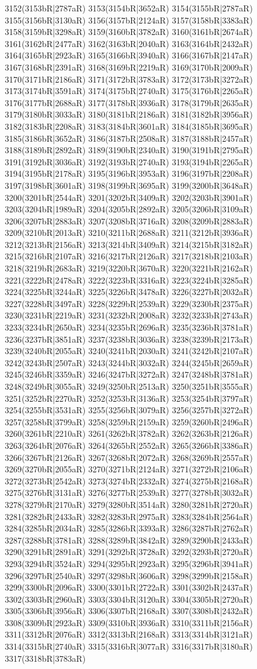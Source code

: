 3152(3153bR|2787aR) 3153(3154bR|3652aR) 3154(3155bR|2787aR) 3155(3156bR|3130aR) 3156(3157bR|2124aR) 3157(3158bR|3383aR) 3158(3159bR|3298aR) 3159(3160bR|3782aR) 3160(3161bR|2674aR) 3161(3162bR|2477aR) 3162(3163bR|2040aR) 3163(3164bR|2432aR) 3164(3165bR|2923aR) 3165(3166bR|3940aR) 3166(3167bR|2147aR) 3167(3168bR|2391aR) 3168(3169bR|2219aR) 3169(3170bR|2009aR) 3170(3171bR|2186aR) 3171(3172bR|3783aR) 3172(3173bR|3272aR) 3173(3174bR|3591aR) 3174(3175bR|2740aR) 3175(3176bR|2265aR) 3176(3177bR|2688aR) 3177(3178bR|3936aR) 3178(3179bR|2635aR) 3179(3180bR|3033aR) 3180(3181bR|2186aR) 3181(3182bR|3956aR) 3182(3183bR|2208aR) 3183(3184bR|3601aR) 3184(3185bR|3695aR) 3185(3186bR|3652aR) 3186(3187bR|2508aR) 3187(3188bR|2457aR) 3188(3189bR|2892aR) 3189(3190bR|2340aR) 3190(3191bR|2795aR) 3191(3192bR|3036aR) 3192(3193bR|2740aR) 3193(3194bR|2265aR) 3194(3195bR|2178aR) 3195(3196bR|3953aR) 3196(3197bR|2208aR) 3197(3198bR|3601aR) 3198(3199bR|3695aR) 3199(3200bR|3648aR) 3200(3201bR|2544aR) 3201(3202bR|3409aR) 3202(3203bR|3901aR) 3203(3204bR|1989aR) 3204(3205bR|2892aR) 3205(3206bR|3109aR) 3206(3207bR|2883aR) 3207(3208bR|3716aR) 3208(3209bR|2883aR) 3209(3210bR|2013aR) 3210(3211bR|2688aR) 3211(3212bR|3936aR) 3212(3213bR|2156aR) 3213(3214bR|3409aR) 3214(3215bR|3182aR) 3215(3216bR|2107aR) 3216(3217bR|2126aR) 3217(3218bR|2103aR) 3218(3219bR|2683aR) 3219(3220bR|3670aR) 3220(3221bR|2162aR) 3221(3222bR|2478aR) 3222(3223bR|3316aR) 3223(3224bR|3285aR) 3224(3225bR|3244aR) 3225(3226bR|3478aR) 3226(3227bR|2032aR) 3227(3228bR|3497aR) 3228(3229bR|2539aR) 3229(3230bR|2375aR) 3230(3231bR|2219aR) 3231(3232bR|2008aR) 3232(3233bR|2743aR) 3233(3234bR|2650aR) 3234(3235bR|2696aR) 3235(3236bR|3781aR) 3236(3237bR|3851aR) 3237(3238bR|3036aR) 3238(3239bR|2173aR) 3239(3240bR|2055aR) 3240(3241bR|2030aR) 3241(3242bR|2107aR) 3242(3243bR|2507aR) 3243(3244bR|3032aR) 3244(3245bR|2659aR) 3245(3246bR|3359aR) 3246(3247bR|3272aR) 3247(3248bR|3781aR) 3248(3249bR|3055aR) 3249(3250bR|2513aR) 3250(3251bR|3555aR) 3251(3252bR|2270aR) 3252(3253bR|3136aR) 3253(3254bR|3797aR) 3254(3255bR|3531aR) 3255(3256bR|3079aR) 3256(3257bR|3272aR) 3257(3258bR|3799aR) 3258(3259bR|2159aR) 3259(3260bR|2496aR) 3260(3261bR|2210aR) 3261(3262bR|3782aR) 3262(3263bR|2126aR) 3263(3264bR|2076aR) 3264(3265bR|2552aR) 3265(3266bR|3386aR) 3266(3267bR|2126aR) 3267(3268bR|2072aR) 3268(3269bR|2557aR) 3269(3270bR|2055aR) 3270(3271bR|2124aR) 3271(3272bR|2106aR) 3272(3273bR|2542aR) 3273(3274bR|2332aR) 3274(3275bR|2168aR) 3275(3276bR|3131aR) 3276(3277bR|2539aR) 3277(3278bR|3032aR) 3278(3279bR|2170aR) 3279(3280bR|3514aR) 3280(3281bR|2720aR) 3281(3282bR|2433aR) 3282(3283bR|2975aR) 3283(3284bR|2564aR) 3284(3285bR|2034aR) 3285(3286bR|3393aR) 3286(3287bR|2762aR) 3287(3288bR|3781aR) 3288(3289bR|3842aR) 3289(3290bR|2433aR) 3290(3291bR|2891aR) 3291(3292bR|3728aR) 3292(3293bR|2720aR) 3293(3294bR|3524aR) 3294(3295bR|2923aR) 3295(3296bR|3941aR) 3296(3297bR|2540aR) 3297(3298bR|3606aR) 3298(3299bR|2158aR) 3299(3300bR|2096aR) 3300(3301bR|2722aR) 3301(3302bR|2437aR) 3302(3303bR|2960aR) 3303(3304bR|3120aR) 3304(3305bR|2720aR) 3305(3306bR|3956aR) 3306(3307bR|2168aR) 3307(3308bR|2432aR) 3308(3309bR|2923aR) 3309(3310bR|3936aR) 3310(3311bR|2156aR) 3311(3312bR|2076aR) 3312(3313bR|2168aR) 3313(3314bR|3121aR) 3314(3315bR|2740aR) 3315(3316bR|3077aR) 3316(3317bR|3180aR) 3317(3318bR|3783aR) 